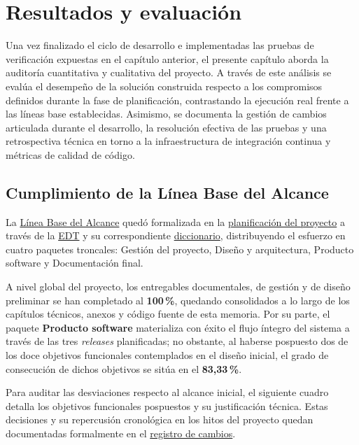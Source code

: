 \chapter{Resultados y evaluación}\label{cap:resultados_y_evaluacion}

Una vez finalizado el ciclo de desarrollo e implementadas las pruebas de verificación expuestas en el capítulo anterior, el presente capítulo aborda la auditoría cuantitativa y cualitativa del proyecto. A través de este análisis se evalúa el desempeño de la solución construida respecto a los compromisos definidos durante la fase de planificación, contrastando la ejecución real frente a las líneas base establecidas. Asimismo, se documenta la gestión de cambios articulada durante el desarrollo, la resolución efectiva de las pruebas y una retrospectiva técnica en torno a la infraestructura de integración continua y métricas de calidad de código.

\section{Cumplimiento de la Línea Base del Alcance}\label{sec:cumplimiento_alcance}

La \hyperref[sec:linea_base_del_alcance]{Línea Base del Alcance} quedó formalizada en la \hyperref[cap:gestion_del_proyecto]{planificación del proyecto} a través de la \hyperref[subsec:edt]{EDT} y su correspondiente \hyperref[subsec:diccionario_edt]{diccionario}, distribuyendo el esfuerzo en cuatro paquetes troncales: Gestión del proyecto, Diseño y arquitectura, Producto software y Documentación final. 

A nivel global del proyecto, los entregables documentales, de gestión y de diseño preliminar se han completado al \textbf{100\,\%}, quedando consolidados a lo largo de los capítulos técnicos, anexos y código fuente de esta memoria. Por su parte, el paquete \textbf{Producto software} materializa con éxito el flujo íntegro del sistema a través de las tres \textit{releases} planificadas; no obstante, al haberse pospuesto dos de los doce objetivos funcionales contemplados en el diseño inicial, el grado de consecución de dichos objetivos se sitúa en el \textbf{83{,}33\,\%}.

Para auditar las desviaciones respecto al alcance inicial, el siguiente cuadro detalla los objetivos funcionales pospuestos y su justificación técnica. Estas decisiones y su repercusión cronológica en los hitos del proyecto quedan documentadas formalmente en el \hyperref[sub:registro_cambios]{registro de cambios}.

